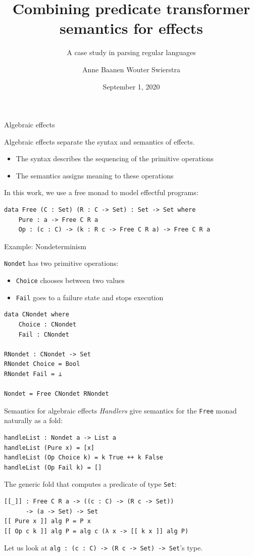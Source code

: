 \documentclass[ignorenonframetext,]{beamer}
\title[Combining predicate transformer semantics]{Combining predicate transformer semantics for effects}
\subtitle{A case study in parsing regular languages}
\author{Anne Baanen \hspace{5.1em} Wouter Swierstra}
\institute{Vrije Universiteit Amsterdam \hspace{1em} Utrecht University}
\date{September 1, 2020}
\date{}
\newcommand{\Agda}[1]{\texttt{#1}\xspace}
\newcommand{\Free}{\Agda{Free}}
\newcommand{\Set}{\Agda{Set}}
\begin{document}
\frame{\titlepage}

\begin{frame}[fragile]{Algebraic effects}

Algebraic effects separate the syntax and semantics of effects.

\begin{itemize}
	\item The syntax describes the sequencing of the primitive operations
	\item The semantics assigns meaning to these operations
\end{itemize}

In this work, we use a free monad to model effectful programs:

\begin{verbatim}
data Free (C : Set) (R : C -> Set) : Set -> Set where
    Pure : a -> Free C R a
    Op : (c : C) -> (k : R c -> Free C R a) -> Free C R a
\end{verbatim}
\end{frame}

\begin{frame}[fragile]{Example: Nondeterminism}

\Agda{Nondet} has two primitive operations:
\begin{itemize}
    \item \Agda{Choice} chooses between two values
    \item \Agda{Fail} goes to a failure state and stops execution
\end{itemize}
\begin{verbatim}
data CNondet where
	Choice : CNondet
	Fail : CNondet

RNondet : CNondet -> Set
RNondet Choice = Bool
RNondet Fail = ⊥

Nondet = Free CNondet RNondet
\end{verbatim}
\end{frame}

\begin{frame}[fragile]{Semantics for algebraic effects}
\emph{Handlers} give semantics for the \Free monad naturally as a fold:
\begin{verbatim}
handleList : Nondet a -> List a
handleList (Pure x) = [x]
handleList (Op Choice k) = k True ++ k False
handleList (Op Fail k) = []
\end{verbatim}

\pause
The generic fold that computes a predicate of type \Set:
\begin{verbatim}
[[_]] : Free C R a -> ((c : C) -> (R c -> Set))
      -> (a -> Set) -> Set
[[ Pure x ]] alg P = P x
[[ Op c k ]] alg P = alg c (λ x -> [[ k x ]] alg P)
\end{verbatim}

\pause
Let us look at \Agda{alg : (c : C) -> (R c -> Set) -> Set}'s type.
\end{frame}
\end{document}
